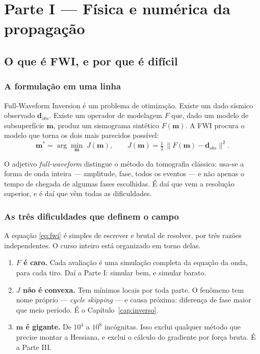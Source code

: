 \documentclass[11pt,a4paper,oneside]{report}
\begin{document}
\part*{\centering\color{azulfwi} Parte I --- Física e numérica da propagação}

\chapter{O que é FWI, e por que é difícil}

\section{A formulação em uma linha}

Full-Waveform Inversion é um problema de otimização. Existe um dado sísmico
observado $\mathbf{d}_{obs}$. Existe um operador de modelagem $F$ que, dado um
modelo de subsuperfície $\mathbf{m}$, produz um sismograma sintético
$F(\mathbf{m})$. A FWI procura o modelo que torna os dois mais parecidos
possível:
\begin{equation}
\mathbf{m}^{*} = \arg\min_{\mathbf{m}} \; J(\mathbf{m}),
\qquad
J(\mathbf{m}) = \tfrac{1}{2}\,\bigl\| F(\mathbf{m}) - \mathbf{d}_{obs} \bigr\|^{2} .
\label{eq:fwi}
\end{equation}

O adjetivo \emph{full-waveform} distingue o método da tomografia clássica:
usa-se a forma de onda inteira --- amplitude, fase, todos os eventos --- e
não apenas o tempo de chegada de algumas fases escolhidas. É daí que vem a
resolução superior, e é daí que vêm todas as dificuldades.

\section{As três dificuldades que definem o campo}

A equação \eqref{eq:fwi} é simples de escrever e brutal de resolver, por três
razões independentes. O curso inteiro está organizado em torno delas.

\begin{enumerate}[leftmargin=*]
\item \textbf{$F$ é caro.} Cada avaliação é uma simulação completa da equação
da onda, para cada tiro. Daí a Parte I: simular bem, e simular barato.

\item \textbf{$J$ não é convexa.} Tem mínimos locais por toda parte. O
fenômeno tem nome próprio --- \emph{cycle skipping} --- e causa próxima:
diferença de fase maior que meio período. É o Capítulo~\ref{cap:inverso}.

\item \textbf{$\mathbf{m}$ é gigante.} De $10^4$ a $10^8$ incógnitas. Isso
exclui qualquer método que precise montar a Hessiana, e exclui o cálculo do
gradiente por força bruta. É a Parte III.
\end{enumerate}
\end{document}
